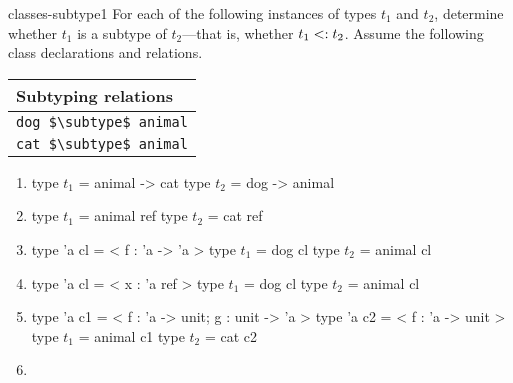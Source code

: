%
\begin{exercise}{classes-subtype1}
For each of the following instances of types $t_1$ and $t_2$,
determine whether $t_1$ is a subtype of $t_2$---that is, whether $t_1 \mathrel{\hbox{<:}} t_2$.
Assume the following class declarations and relations.

\begin{center}
\begin{tabular}{|l|}
\hline
Subtyping relations\\
\hline
\hbox{\lstinline/dog $\subtype$ animal/}\\
\hbox{\lstinline/cat $\subtype$ animal/}\\
\hline
\end{tabular}
\end{center}

\begin{enumerate}
\item

\begin{ocamllisting}
type $t_1$ = animal -> cat
type $t_2$ = dog -> animal
\end{ocamllisting}

\item

\begin{ocamllisting}
type $t_1$ = animal ref
type $t_2$ = cat ref
\end{ocamllisting}

\item

\begin{ocamllisting}
type 'a cl = < f : 'a -> 'a >
type $t_1$ = dog cl
type $t_2$ = animal cl
\end{ocamllisting}

\item

\begin{ocamllisting}
type 'a cl = < x : 'a ref >
type $t_1$ = dog cl
type $t_2$ = animal cl
\end{ocamllisting}

\item

\begin{ocamllisting}
type 'a c1 = < f : 'a -> unit; g : unit -> 'a >
type 'a c2 = < f : 'a -> unit >
type $t_1$ = animal c1
type $t_2$ = cat c2
\end{ocamllisting}

\item


\end{enumerate}
\end{exercise}

